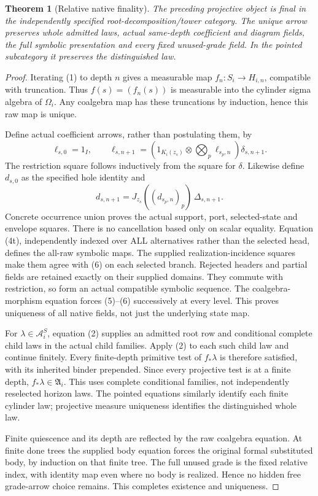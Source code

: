 \documentclass[11pt]{article}
\newtheorem{theorem}{Theorem}\newtheorem{proposition}{Proposition}
\begin{document}
\begin{theorem}[Relative native finality]
The preceding projective object is final in the independently specified root-decomposition/tower category. The unique arrow preserves whole admitted laws, actual same-depth coefficient and diagram fields, the full symbolic presentation and every fixed unused-grade field. In the pointed subcategory it preserves the distinguished law.
\end{theorem}
\begin{proof}
Iterating (1) to depth $n$ gives a measurable map $f_n:S_i\to H_{i,n}$, compatible with truncation. Thus $f(s)=(f_n(s))$ is measurable into the cylinder sigma algebra of $\Omega_i$. Any coalgebra map has these truncations by induction, hence this raw map is unique.

Define actual coefficient arrows, rather than postulating them, by
\[
 \ell_{s,0}=1_I,\qquad
 \ell_{s,n+1}=
 \left(1_{K_i(z_s)}\otimes\bigotimes_p\ell_{s_p,n}\right)\delta_{s,n+1}. \tag{5}
\]
The restriction square follows inductively from the square for $\delta$. Likewise define $d_{s,0}$ as the specified hole identity and
\[
 d_{s,n+1}=J_{z_s}((d_{s_p,n})_p)\,\Delta_{s,n+1}. \tag{6}
\]
Concrete occurrence union proves the actual support, port, selected-state and envelope squares. There is no cancellation based only on scalar equality. Equation (4t), independently indexed over ALL alternatives rather than the selected head, defines the all-raw symbolic maps. The supplied realization-incidence squares make them agree with (6) on each selected branch. Rejected headers and partial fields are retained exactly on their supplied domains. They commute with restriction, so form an actual compatible symbolic sequence. The coalgebra-morphism equation forces (5)--(6) successively at every level. This proves uniqueness of all native fields, not just the underlying state map.

For $\lambda\in\mathcal A^S_i$, equation (2) supplies an admitted root row and conditional complete child laws in the actual child families. Apply (2) to each such child law and continue finitely. Every finite-depth primitive test of $f_*\lambda$ is therefore satisfied, with its inherited binder prepended. Since every projective test is at a finite depth, $f_*\lambda\in\mathfrak A_i$. This uses complete conditional families, not independently reselected horizon laws. The pointed equations similarly identify each finite cylinder law; projective measure uniqueness identifies the distinguished whole law.

Finite quiescence and its depth are reflected by the raw coalgebra equation. At finite done trees the supplied body equation forces the original formal substituted body, by induction on that finite tree. The full unused grade is the fixed relative index, with identity map even where no body is realized. Hence no hidden free grade-arrow choice remains. This completes existence and uniqueness.
\end{proof}
\end{document}
